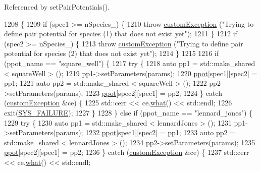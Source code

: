 Referenced by set\-Pair\-Potentials().


\begin{DoxyCode}
1208                                                                                                            
                                                \{
1209     \textcolor{keywordflow}{if} (spec1 >= nSpecies\_) \{
1210         \textcolor{keywordflow}{throw} \hyperlink{classcustom_exception}{customException} (\textcolor{stringliteral}{"Trying to define pair potential for species (1) that does
       not exist yet"});
1211     \}
1212     \textcolor{keywordflow}{if} (spec2 >= nSpecies\_) \{
1213         \textcolor{keywordflow}{throw} \hyperlink{classcustom_exception}{customException} (\textcolor{stringliteral}{"Trying to define pair potential for species (2) that does
       not exist yet"});
1214     \}
1215 
1216     \textcolor{keywordflow}{if} (ppot\_name == \textcolor{stringliteral}{"square\_well"}) \{
1217         \textcolor{keywordflow}{try} \{
1218             \textcolor{keyword}{auto} pp1 = std::make\_shared < squareWell > ();
1219             pp1->setParameters(params);
1220             \hyperlink{classsim_system_ad2e290b5963f132e6a3a56cee35c8e9f}{ppot}[spec1][spec2] = pp1;
1221             \textcolor{keyword}{auto} pp2 = std::make\_shared < squareWell > ();
1222             pp2->setParameters(params);
1223             \hyperlink{classsim_system_ad2e290b5963f132e6a3a56cee35c8e9f}{ppot}[spec2][spec1] = pp2;
1224         \} \textcolor{keywordflow}{catch} (\hyperlink{classcustom_exception}{customException} &ce) \{
1225             std::cerr << ce.\hyperlink{classcustom_exception_aeb6ab5848b038adfc68fde86a512f691}{what}() << std::endl;
1226             exit(\hyperlink{global_8h_a428dfe1ef0a6ff4b1fdebf275f6aff2e}{SYS\_FAILURE});
1227         \}
1228     \} \textcolor{keywordflow}{else} \textcolor{keywordflow}{if} (ppot\_name == \textcolor{stringliteral}{"lennard\_jones"}) \{
1229         \textcolor{keywordflow}{try} \{
1230             \textcolor{keyword}{auto} pp1 = std::make\_shared < lennardJones > ();
1231             pp1->setParameters(params);
1232             \hyperlink{classsim_system_ad2e290b5963f132e6a3a56cee35c8e9f}{ppot}[spec1][spec2] = pp1;
1233             \textcolor{keyword}{auto} pp2 = std::make\_shared < lennardJones > ();
1234             pp2->setParameters(params);
1235             \hyperlink{classsim_system_ad2e290b5963f132e6a3a56cee35c8e9f}{ppot}[spec2][spec1] = pp2;
1236         \} \textcolor{keywordflow}{catch} (\hyperlink{classcustom_exception}{customException} &ce) \{
1237             std::cerr << ce.\hyperlink{classcustom_exception_aeb6ab5848b038adfc68fde86a512f691}{what}() << std::endl;

\end{DoxyCode}
